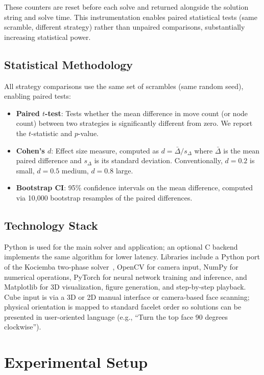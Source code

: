 \documentclass[10pt,twocolumn,a4paper]{article}
\begin{document}
These counters are reset before each solve and returned alongside the solution string and solve time. This instrumentation enables paired statistical tests (same scramble, different strategy) rather than unpaired comparisons, substantially increasing statistical power.

\subsection{Statistical Methodology}
\label{sec:stats}

All strategy comparisons use the same set of scrambles (same random seed), enabling paired tests:
\begin{itemize}[leftmargin=*]
  \item \textbf{Paired $t$-test}: Tests whether the mean difference in move count (or node count) between two strategies is significantly different from zero. We report the $t$-statistic and $p$-value.
  \item \textbf{Cohen's $d$}: Effect size measure, computed as $d = \bar{\Delta} / s_\Delta$ where $\bar{\Delta}$ is the mean paired difference and $s_\Delta$ is its standard deviation. Conventionally, $d = 0.2$ is small, $d = 0.5$ medium, $d = 0.8$ large.
  \item \textbf{Bootstrap CI}: 95\% confidence intervals on the mean difference, computed via 10,000 bootstrap resamples of the paired differences.
\end{itemize}

\subsection{Technology Stack}
Python is used for the main solver and application; an optional C backend implements the same algorithm for lower latency. Libraries include a Python port of the Kociemba two-phase solver~\cite{muodov}, OpenCV for camera input, NumPy for numerical operations, PyTorch for neural network training and inference, and Matplotlib for 3D visualization, figure generation, and step-by-step playback. Cube input is via a 3D or 2D manual interface or camera-based face scanning; physical orientation is mapped to standard facelet order so solutions can be presented in user-oriented language (e.g., ``Turn the top face 90 degrees clockwise'').

\section{Experimental Setup}
\label{sec:setup}
\end{document}
